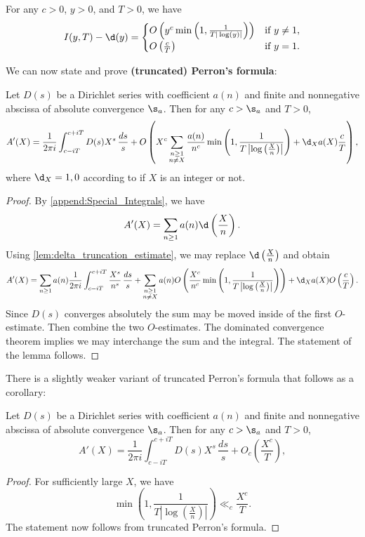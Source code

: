     \begin{lemma}\label{lem:delta_truncation_estimate}
      For any $c > 0$, $y > 0$, and $T > 0$, we have
      \[
        I(y,T)-\d(y) = \begin{cases} O\left(y^{c}\min\left(1,\frac{1}{T|\log(y)|}\right)\right) & \text{if $y \neq 1$}, \\ O\left(\frac{c}{T}\right) & \text{if $y = 1$}. \end{cases}
      \]
    \end{lemma}

    We can now state and prove \textbf{(truncated) Perron's formula}:

    \begin{theorem}
      Let $D(s)$ be a Dirichlet series with coefficient $a(n)$ and finite and nonnegative abscissa of absolute convergence $\s_{a}$. Then for any $c > \s_{a}$ and $T > 0$,
      \[
        A'(X) = \frac{1}{2\pi i}\int_{c-iT}^{c+iT}D(s)X^{s}\,\frac{ds}{s}+O\left(X^{c}\sum_{\substack{n \ge 1 \\ n \neq X}}\frac{a(n)}{n^{c}}\min\left(1,\frac{1}{T\left|\log\left(\frac{X}{n}\right)\right|}\right)+\d_{X}a(X)\frac{c}{T}\right),
      \]
      where $\d_{X} = 1,0$ according to if $X$ is an integer or not.
    \end{theorem}
    \begin{proof}
      By \cref{append:Special_Integrals}, we have
      \[
        A'(X) = \sum_{n \ge 1}a(n)\d\left(\frac{X}{n}\right).
      \]
      Using \cref{lem:delta_truncation_estimate}, we may replace $\d\left(\frac{X}{n}\right)$ and obtain
      \[
        A'(X) = \sum_{n \ge 1}a(n)\frac{1}{2\pi i}\int_{c-iT}^{c+iT}\frac{X^{s}}{n^{s}}\,\frac{ds}{s}+\sum_{\substack{n \ge 1 \\ n \neq X}}a(n)O\left(\frac{X^{c}}{n^{c}}\min\left(1,\frac{1}{T\left|\log\left(\frac{X}{n}\right)\right|}\right)\right)+\d_{X}a(X)O\left(\frac{c}{T}\right).
      \]
      Since $D(s)$ converges absolutely the sum may be moved inside of the first $O$-estimate. Then combine the two $O$-estimates. The dominated convergence theorem implies we may interchange the sum and the integral. The statement of the lemma follows.
    \end{proof}

    There is a slightly weaker variant of truncated Perron's formula that follows as a corollary:

    \begin{corollary}
      Let $D(s)$ be a Dirichlet series with coefficient $a(n)$ and finite and nonnegative abscissa of absolute convergence $\s_{a}$. Then for any $c > \s_{a}$ and $T > 0$,
      \[
        A'(X) = \frac{1}{2\pi i}\int_{c-iT}^{c+iT}D(s)X^{s}\,\frac{ds}{s}+O_{c}\left(\frac{X^{c}}{T}\right),
      \]
    \end{corollary}
    \begin{proof}
      For sufficiently large $X$, we have
      \[
        \min\left(1,\frac{1}{T\left|\log\left(\frac{X}{n}\right)\right|}\right) \ll_{c} \frac{X^{c}}{T}.
      \]
      The statement now follows from truncated Perron's formula.
    \end{proof}

